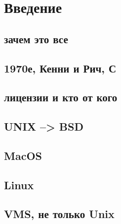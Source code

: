 \section{Введение}
\subsection{зачем это все}
\subsection{1970е, Кенни и Рич, С}
\subsection{лицензии и кто от кого}
\subsection{UNIX --> BSD}
\subsection{MacOS}
\subsection{Linux}
\subsection{VMS, не только Unix}
\newpage
